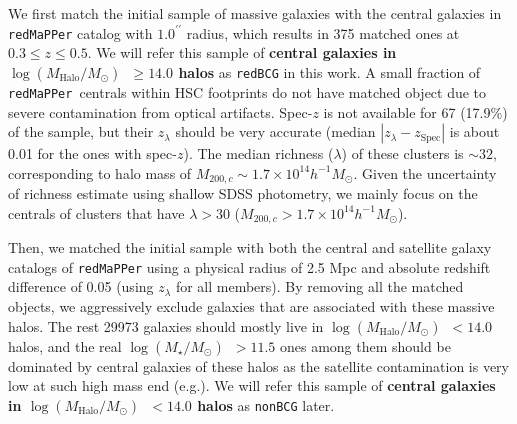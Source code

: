 \documentclass[preprint]{aastex}
\def\arcsec{{\prime\prime}}
\def\redm{\texttt{redMaPPer}}
\def\logms{{$\log (M_{\star}/M_{\odot})$}~}
\def\logmh{{$\log (M_{\mathrm{Halo}}/M_{\odot})$}~}
\begin{document}
\begin{CJK*}{UTF8}{gbsn}
    We first match the initial sample of massive galaxies with the central galaxies 
    in \redm{} catalog with $1.0^{\arcsec}$ radius, which results in 375 matched ones at 
    $0.3 \leq z \leq 0.5$.  
    We will refer this sample of \textbf{central galaxies in \logmh$\ge 14.0$ halos} as 
    \texttt{redBCG} in this work.
    A small fraction of \redm~centrals within HSC footprints do not have matched object 
    due to severe contamination from optical artifacts.
    Spec-$z$ is not available for 67 (17.9\%) of the sample, but their $z_{\lambda}$ 
    should be very accurate (median $|z_{\lambda} - z_{\mathrm{Spec}}|$ is about 0.01 
    for the ones with spec-$z$).
    The median richness ($\lambda$) of these clusters is $\sim 32$, corresponding to 
    halo mass of $M_{200,c}\sim 1.7\times 10^{14} h^{-1} M_{\odot}$. 
    Given the uncertainty of richness estimate using shallow SDSS photometry, we 
    mainly focus on the centrals of clusters that have $\lambda > 30$ 
    ($M_{200,c}> 1.7\times 10^{14} h^{-1} M_{\odot}$).

    Then, we matched the initial sample with both the central and satellite galaxy catalogs 
    of \redm{} using a physical radius of 2.5 Mpc and absolute redshift difference of 
    0.05 (using $z_{\lambda}$ for all members).  
    By removing all the matched objects, we aggressively exclude galaxies that are 
    associated with these massive halos.  
    The rest 29973 galaxies should mostly live in \logmh$< 14.0$ halos, and the real 
    \logms$ > 11.5$ ones among them should be dominated by central galaxies of these 
    halos as the satellite contamination is very low at such high mass end 
    (e.g.\citealt{vanUitert2016}).
    We will refer this sample of \textbf{central galaxies in \logmh$< 14.0$ halos} as 
    \texttt{nonBCG} later.


\end{CJK*}
\end{document}
